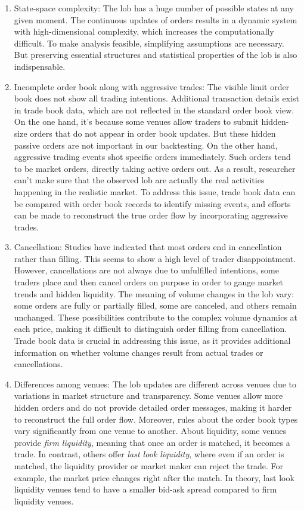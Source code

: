 \begin{enumerate}
    \item State-space complexity: The \gls{lob} has a huge number of possible states at any given moment. The continuous updates of orders results in a dynamic system with high-dimensional complexity, which increases the computationally difficult. To make analysis feasible, simplifying assumptions are necessary. But preserving essential structures and statistical properties of the \gls{lob} is also indispensable.

    \item Incomplete order book along with aggressive trades: The visible limit order book does not show all trading intentions. Additional transaction details exist in trade book data, which are not reflected in the standard order book view. On the one hand, it's because some \gls{venues} allow traders to submit hidden-size orders that do not appear in order book updates. But these hidden passive orders are not important in our backtesting. On the other hand, aggressive trading events shot specific orders immediately. Such orders tend to be market orders, directly taking active orders out. As a result, researcher can't make sure that the observed \gls{lob} are actually the real activities happening in the realistic market. To address this issue, trade book data can be compared with order book records to identify missing events, and efforts can be made to reconstruct the true order flow by incorporating aggressive trades.

    \item Cancellation: Studies have indicated that most orders end in cancellation rather than filling. This seems to show a high level of trader disappointment. However, cancellations are not always due to unfulfilled intentions, some traders place and then cancel orders on purpose in order to gauge market trends and hidden liquidity. The meaning of volume changes in the \gls{lob} vary: some orders are fully or partially filled, some are canceled, and others remain unchanged. These possibilities contribute to the complex volume dynamics at each price, making it difficult to distinguish order filling from cancellation. Trade book data is crucial in addressing this issue, as it provides additional information on whether volume changes result from actual trades or cancellations.

    \item Differences among venues: The \gls{lob} updates are different across venues due to variations in market structure and transparency. Some venues allow more hidden orders and do not provide detailed order messages, making it harder to reconstruct the full order flow. Moreover, rules about the order book types vary significantly from one venue to another.
    About liquidity, some venues provide \textit{firm liquidity}, meaning that once an order is matched, it becomes a trade. In contrast, others offer \textit{last look liquidity}, where even if an order is matched, the liquidity provider or market maker can reject the trade. For example, the market price changes right after the match. In theory, last look liquidity venues tend to have a smaller bid-ask spread compared to firm liquidity venues.
\end{enumerate}

